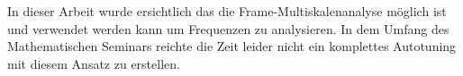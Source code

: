 

In dieser Arbeit wurde ersichtlich das die Frame-Multiskalenanalyse möglich ist und verwendet werden kann um Frequenzen zu analysieren. In dem Umfang des Mathematischen Seminars reichte die Zeit leider nicht ein komplettes Autotuning mit diesem Ansatz zu erstellen. 